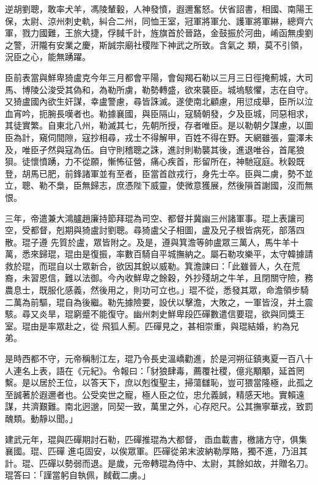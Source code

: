 \begin{pinyinscope}
 逆胡劉聰，敢率犬羊，馮陵輦轂，人神發憤，遐邇奮怒。伏省詔書，相國、南陽王保，太尉、涼州刺史軌，糾合二州，同恤王室，冠軍將軍允、護軍將軍綝，總齊六軍，戮力國難，王旅大捷，俘馘千計，旌旗首於晉路，金鼓振於河曲，崤函無虔劉之警，汧隴有安業之慶，斯誠宗廟社稷陛下神武之所致。含氣之
 類，莫不引領，況臣之心，能無踴躍。



 臣前表當與鮮卑猗盧克今年三月都會平陽，會匈羯石勒以三月三日徑掩薊城，大司馬、博陵公浚受其偽和，為勒所虜，勒勢轉盛，欲來襲臣。城塢駭懼，志在自守。又猗盧國內欲生奸謀，幸盧警慮，尋皆誅滅。遂使南北顧慮，用愆成舉，臣所以泣血宵吟，扼腕長嘆者也。勒據襄國，與臣隔山，寇騎朝發，夕及臣城，同惡相求，其徒實繁。自東北八州，勒滅其七，先朝所授，存者唯臣。是以勒朝夕謀慮，以圖臣為計，窺伺間隙，寇抄相尋，戎士不得解甲，百姓不得在野。天網雖張，靈澤未及，唯臣孑然與寇為伍。自守則稽聰之誅，進討則勒襲其後，進退唯谷，首尾狼狽。徒懷憤踴，力不從願，慚怖征營，痛心疾首，形留所在，神馳寇庭。秋穀既登，胡馬已肥，前鋒諸軍並有至者，臣當首啟戎行，身先士卒。臣與二虜，勢不並立，聰、勒不梟，臣無歸志，庶憑陛下威靈，使微意獲展，然後隕首謝國，沒而無恨。



 三年，帝遣兼大鴻臚趙廉持節拜琨為司空、都督并冀幽三州諸軍事。琨上表讓司空，受都督，剋期與猗盧討劉聰。尋猗盧父子相圖，盧及兄子根皆病死，部落四散。琨子遵
 先質於盧，眾皆附之。及是，遵與箕澹等帥盧眾三萬人，馬牛羊十萬，悉來歸琨，琨由是復振，率數百騎自平城撫納之。屬石勒攻樂平，太守韓據請救於琨，而琨自以士眾新合，欲因其銳以威勒。箕澹諫曰：「此雖晉人，久在荒裔，未習恩信，難以法御。今內收鮮卑之餘穀，外抄殘胡之牛羊，且閉關守險，務農息士，既服化感義，然後用之，則功可立也。」琨不從，悉發其眾，命澹領步騎二萬為前驅，琨自為後繼。勒先據險要，設伏以擊澹，大敗之，一軍皆沒，并土震駭。尋又炎旱，琨窮蹙不能復守。幽州刺史鮮卑段匹磾數遣信要琨，欲與同獎王室。琨由是率眾赴之，從
 飛狐人薊。匹磾見之，甚相崇重，與琨結婚，約為兄弟。



 是時西都不守，元帝稱制江左，琨乃令長史溫嶠勸進，於是河朔征鎮夷夏一百八十人連名上表，語在《元紀》。令報曰：「豺狼肆毒，薦覆社稷，億兆顒顒，延首罔繫。是以居於王位，以答天下，庶以剋復聖主，掃蕩讎恥，豈可猥當隆極，此孤之至誠著於遐邇者也。公受奕世之寵，極人臣之位，忠允義誠，精感天地。實賴遠謀，共濟艱難。南北迥邈，同契一致，萬里之外，心存咫尺。公其撫寧華戎，致罰醜類。動靜以聞。」



 建武元年，琨與匹磾期討石勒，匹磾推琨為大都督，臿血載書，檄諸方守，俱集襄國。琨、匹磾
 進屯固安，以俟眾軍。匹磾從弟末波納勒厚賂，獨不進，乃沮其計。琨、匹磾以勢弱而退。是歲，元帝轉琨為侍中、太尉，其餘如故，并贈名刀。琨答曰：「謹當躬自執佩，馘截二虜。」




\end{pinyinscope}
